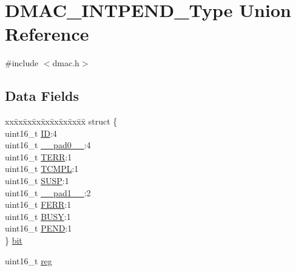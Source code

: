 \hypertarget{union_d_m_a_c___i_n_t_p_e_n_d___type}{}\section{D\+M\+A\+C\+\_\+\+I\+N\+T\+P\+E\+N\+D\+\_\+\+Type Union Reference}
\label{union_d_m_a_c___i_n_t_p_e_n_d___type}


{\ttfamily \#include $<$dmac.\+h$>$}

\subsection*{Data Fields}
\begin{DoxyCompactItemize}
\item 
\begin{tabbing}
xx\=xx\=xx\=xx\=xx\=xx\=xx\=xx\=xx\=\kill
struct \{\\
\>uint16\_t \mbox{\hyperlink{union_d_m_a_c___i_n_t_p_e_n_d___type_a9bb81603329def43dbb55e1ae69996d9}{ID}}:4\\
\>uint16\_t \mbox{\hyperlink{union_d_m_a_c___i_n_t_p_e_n_d___type_a77132c2c26a75f5b8751b235cda23828}{\_\_pad0\_\_}}:4\\
\>uint16\_t \mbox{\hyperlink{union_d_m_a_c___i_n_t_p_e_n_d___type_afff2a374bc3b976a3c98720b69a5a416}{TERR}}:1\\
\>uint16\_t \mbox{\hyperlink{union_d_m_a_c___i_n_t_p_e_n_d___type_ae0ac120824598c21c231eaee97cf818e}{TCMPL}}:1\\
\>uint16\_t \mbox{\hyperlink{union_d_m_a_c___i_n_t_p_e_n_d___type_adc63eafd36bd81481abd075fc620d799}{SUSP}}:1\\
\>uint16\_t \mbox{\hyperlink{union_d_m_a_c___i_n_t_p_e_n_d___type_ab72e3a1f2f7db8695c60c658f5a0f11a}{\_\_pad1\_\_}}:2\\
\>uint16\_t \mbox{\hyperlink{union_d_m_a_c___i_n_t_p_e_n_d___type_ab3d513f73b000612e955650fb41c093f}{FERR}}:1\\
\>uint16\_t \mbox{\hyperlink{union_d_m_a_c___i_n_t_p_e_n_d___type_a61f6476a13c26863b62e1cd31e687e38}{BUSY}}:1\\
\>uint16\_t \mbox{\hyperlink{union_d_m_a_c___i_n_t_p_e_n_d___type_a19ba099bdcf8a4fc82144a3e9fc8639d}{PEND}}:1\\
\} \mbox{\hyperlink{union_d_m_a_c___i_n_t_p_e_n_d___type_a74e4ea2154db11813bca0faa0994c62a}{bit}}\\

\end{tabbing}\item 
uint16\+\_\+t \mbox{\hyperlink{union_d_m_a_c___i_n_t_p_e_n_d___type_a11760f5020019f4aa8cb02e694f7cc44}{reg}}
\end{DoxyCompactItemize}


